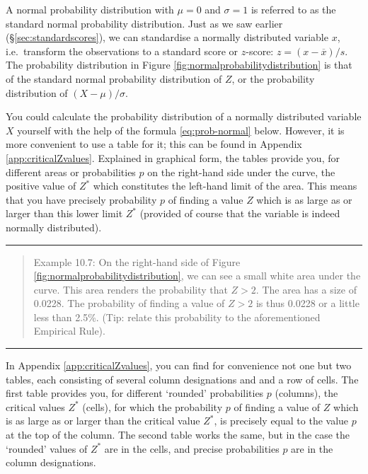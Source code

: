 \documentclass[
]{book}
\begin{document}
A normal probability distribution with \(\mu=0\) and \(\sigma=1\) is referred to as
the standard normal probability distribution. Just as we saw earlier
(§\ref{sec:standardscores}), we can standardise a normally distributed
variable \(x\), i.e.~transform the observations to a standard score
or \(z\)-score: \(z = (x-\overline{x})/s\).
The probability distribution in
Figure \ref{fig:normalprobabilitydistribution} is that of the standard normal
probability distribution of \(Z\), or the probability distribution of \((X-\mu)/\sigma\).

You could calculate the probability distribution of a normally distributed
variable \(X\) yourself with the help of the formula
\eqref{eq:prob-normal} below. However, it is more convenient to
use a table for it; this can be found in
Appendix \ref{app:criticalZvalues}.
Explained in graphical form, the tables provide you, for
different areas or probabilities \(p\) on the right-hand side under the curve,
the positive value of \(Z^*\) which constitutes the left-hand limit of the area.
This means that you have precisely probability \(p\) of finding
a value \(Z\) which is as large as or larger than this lower limit \(Z^*\)
(provided of course that the variable is indeed normally distributed).

\begin{center}\rule{0.5\linewidth}{0.5pt}\end{center}

\begin{quote}
Example 10.7: On the right-hand side of Figure
\ref{fig:normalprobabilitydistribution}, we can see a small white area
under the curve. This area renders the probability that
\(Z>2\). The area has a size of 0.0228. The probability of finding a value of \(Z>2\) is thus 0.0228 or a little less than 2.5\%. (Tip: relate this
probability to the aforementioned Empirical Rule).
\end{quote}

\begin{center}\rule{0.5\linewidth}{0.5pt}\end{center}

In Appendix \ref{app:criticalZvalues}, you can find for convenience not one but two
tables, each consisting of several column designations and
and a row of cells. The first table provides you, for different `rounded'
probabilities \(p\) (columns), the critical values \(Z^*\) (cells), for which the
probability \(p\) of finding a value of \(Z\) which is as large as or larger
than the critical value \(Z^*\), is precisely equal to the value \(p\)
at the top of the column. The second table works the same, but in the case the
`rounded' values of \(Z^*\) are in the cells, and precise probabilities \(p\) are in the
column designations.
\end{document}
